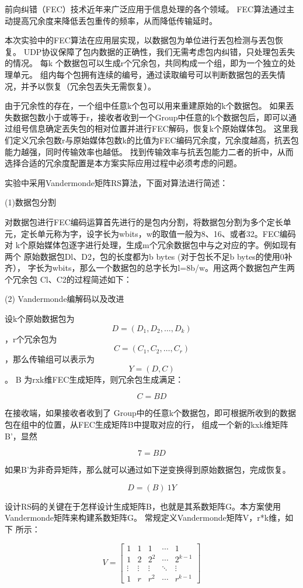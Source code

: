 \documentclass[onecolumn]{article}
\begin{document}
\begin{CJK*}{UTF8}{gbsn}
前向纠错（FEC）技术近年来广泛应用于信息处理的各个领域。
FEC算法通过主动提高冗余度来降低丢包重传的频率，从而降低传输延时。

本次实验中的FEC算法在应用层实现，以数据包为单位进行丟包检测与丟包恢复。
UDP协议保障了包内数据的正确性，我们无需考虑包内纠错，只处理包丢失的情况。
每k 个数据包可以生成r个冗余包，共同构成一个组，即为一个独立的处理单元。
组内每个包拥有连续的编号，通过读取编号可以判断数据包的丟失情况，并予以恢复（冗余包丟失无需恢复）。 

由于冗余性的存在，一个组中任意k个包可以用来重建原始的k个数据包。
如果丟失数据包数小于或等于r，接收者收到一个Group中任意的k个数据包后，即可以通过组号信息确定丟失包的相对位置并进行FEC解码，恢复k个原始媒体包。
这里我们定义冗余包数r与原始媒体包数k的比值为FEC编码冗余度，冗余度越高，抗丟包能力越强，同时传输效率也越低。
找到传输效率与抗丟包能力二者的折中，从而 选择合适的冗余度配置是本方案实际应用过程中必须考虑的问题。

实验中采用Vandermonde矩阵RS算法，下面对算法进行简述：

 (1)数据包分割
 
对数据包进行FEC编码运算首先进行的是包内分割，将数据包分割为多个定长单元，定长单元称为字，设字长为wbits，w的取值一般为8、16、或者32。FEC编码对 k个原始媒体包逐字进行处理，生成m个冗余数据包中与之对应的字。例如现有两个 原始数据包Dl、D2，包的长度都为b bytes (对于包长不足b bytes的使用0补齐）， 字长为wbits，那么一个数据包的总字长为l=8b/w。用这两个数据包产生两个冗余包 Cl、C2的过程简述如下：

(2) Vandermonde编解码以及改进

设k个原始数据包为$$D= (D_1,D_2,\dots,D_k)$$，r个冗余包为$$C=(C_1,C_2,\dots,C_r)$$，那么传输组可以表示为$$Y= (D,C)$$。
B 为rxk维FEC生成矩阵，则冗余包生成满足：

$$C=BD$$

在接收端，如果接收者收到了 Group中的任意k个数据包，即可根据所收到的数据包在组中的位置，从FEC生成矩阵B中提取对应的行， 组成一个新的kxk维矩阵B’，显然

$$7 =BD$$

如果B’为非奇异矩阵，那么就可以通过如下逆变换得到原始数据包，完成恢复。

$$D = (B)~1Y$$

设计RS码的关键在于怎样设计生成矩阵B，也就是其系数矩阵G。本方案使用Vandermonde矩阵来构建系数矩阵G。
常规定义Vandermonde矩阵V，r*k维，如下 所示：

$$V=
\left[
\begin{matrix}
	1      & 1      & 1      & \cdots & 1       \\
	1      & 2      & 2^2    & \cdots & 2^{k-1} \\
	\vdots & \vdots & \vdots & \ddots & \vdots  \\
	1      & r      & r^2    & \cdots & r^{k-1}
\end{matrix}
\right]
$$


\end{CJK*}
\end{document}
